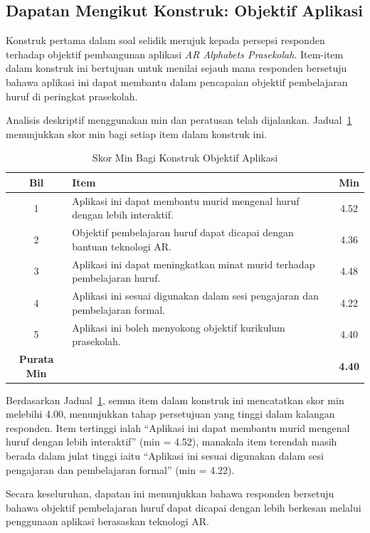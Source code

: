 {{\subsection{Dapatan Mengikut Konstruk: Objektif Aplikasi}

Konstruk pertama dalam soal selidik merujuk kepada persepsi responden terhadap objektif pembangunan aplikasi \textit{AR Alphabets Prasekolah}. Item-item dalam konstruk ini bertujuan untuk menilai sejauh mana responden bersetuju bahawa aplikasi ini dapat membantu dalam pencapaian objektif pembelajaran huruf di peringkat prasekolah.

Analisis deskriptif menggunakan min dan peratusan telah dijalankan. Jadual~\ref{jadual:objektifAplikasi} menunjukkan skor min bagi setiap item dalam konstruk ini.

\begin{table}[H]
\centering
\caption{Skor Min Bagi Konstruk Objektif Aplikasi}
\label{jadual:objektifAplikasi}
\begin{tabular}{|c|p{9cm}|c|}
\hline
\textbf{Bil} & \textbf{Item} & \textbf{Min} \\
\hline
1 & Aplikasi ini dapat membantu murid mengenal huruf dengan lebih interaktif. & 4.52 \\
\hline
2 & Objektif pembelajaran huruf dapat dicapai dengan bantuan teknologi AR. & 4.36 \\
\hline
3 & Aplikasi ini dapat meningkatkan minat murid terhadap pembelajaran huruf. & 4.48 \\
\hline
4 & Aplikasi ini sesuai digunakan dalam sesi pengajaran dan pembelajaran formal. & 4.22 \\
\hline
5 & Aplikasi ini boleh menyokong objektif kurikulum prasekolah. & 4.40 \\
\hline
\textbf{Purata Min} & & \textbf{4.40} \\
\hline
\end{tabular}
\end{table}

Berdasarkan Jadual~\ref{jadual:objektifAplikasi}, semua item dalam konstruk ini mencatatkan skor min melebihi 4.00, menunjukkan tahap persetujuan yang tinggi dalam kalangan responden. Item tertinggi ialah “Aplikasi ini dapat membantu murid mengenal huruf dengan lebih interaktif” (min = 4.52), manakala item terendah masih berada dalam julat tinggi iaitu “Aplikasi ini sesuai digunakan dalam sesi pengajaran dan pembelajaran formal” (min = 4.22).

Secara keseluruhan, dapatan ini menunjukkan bahawa responden bersetuju bahawa objektif pembelajaran huruf dapat dicapai dengan lebih berkesan melalui penggunaan aplikasi berasaskan teknologi AR.
}}

